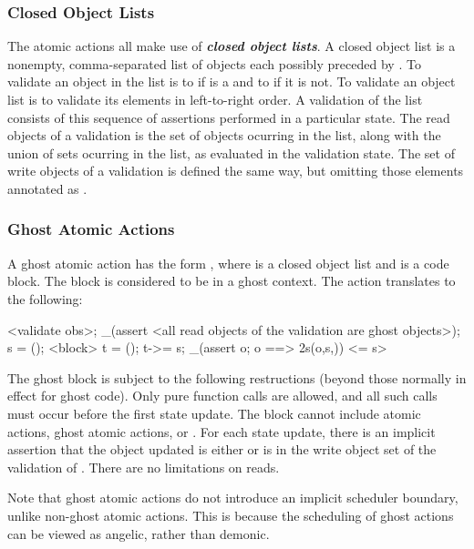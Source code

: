 \documentclass[preprint,nocopyrightspace]{sigplanconf}
\newcommand{\Def}[1]{\textit{\textbf{#1}}}
\begin{document}
{{{{\begin{VCC}
\subsubsection{Closed Object Lists}
The atomic actions all make use of \Def{closed object lists}. A closed
object list is a nonempty, comma-separated list of objects
each possibly preceded
by . To validate an object  in the list is to 
 if  is a \vcc{\claim} and to
 if it is not.
To validate an object list is to validate its elements in
left-to-right order. A validation of the list consists of this
sequence of assertions performed in a particular state. The read
objects of a validation is the set of objects ocurring in the list,
along with the union of sets ocurring in the list, as evaluated in the
validation state. The set of write objects of a validation is defined
the same way, but omitting those elements annotated
as .

\subsubsection{Ghost Atomic Actions}
A ghost atomic action has the form ,
where  is a closed object list and  is a code
block. The block is considered to be in a ghost context. 
The action translates to the following:

\begin{VCC}
<validate obs>;
_(assert <all read objects of the validation are ghost objects>);
\state s = \now();
<block>
\state t = \now();
t->\last = s;
_(assert \forall \object o; o 
  ==> \inv2s(o,s,\now))
<\last = s>
\end{VCC}

The ghost block is subject to the following restructions (beyond those
normally in effect for ghost code). Only pure function calls are
allowed, and all such calls must occur before the first state update. The
block cannot include atomic actions, ghost atomic
actions,  or . For each state update,
there is an implicit assertion that the object updated is
either \vcc{\mutable} or is in the write object set of the validation
of . There are no limitations on reads.

Note that ghost atomic actions do not introduce an implicit scheduler
boundary, unlike non-ghost atomic actions. This is because the
scheduling of ghost actions can be viewed as angelic, rather than
demonic.


\end{VCC}}}}}
\end{document}
